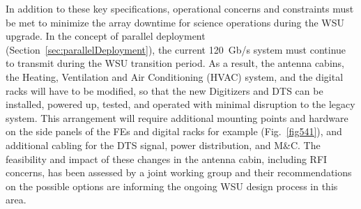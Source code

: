 In addition to these key specifications, operational concerns and constraints must be met to minimize the array downtime for science operations during the WSU upgrade. In the concept of parallel deployment (Section~\ref{sec:parallelDeployment}), the current 120~Gb/s system must continue to transmit during the WSU transition period. As a result, the antenna cabins, the Heating, Ventilation and Air Conditioning (HVAC) system, and the digital racks will have to be modified, so that the new Digitizers and DTS can be installed, powered up, tested, and operated with minimal disruption to the legacy system. This arrangement will require additional mounting points and hardware on the side panels of the FEs and digital racks for example (Fig.~\ref{fig541}), and additional cabling for the DTS signal, power distribution, and M\&C. The feasibility and impact of these changes in the antenna cabin, including RFI concerns, has been assessed by a joint working group %
\cite{IFSwitchLocation} and their recommendations on the possible options are informing the ongoing WSU design process in this area.

